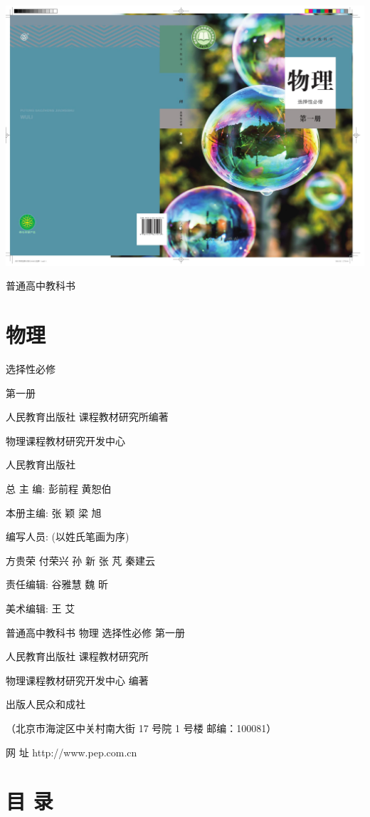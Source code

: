 \documentclass[10pt]{article}
\begin{document}
\begin{center}
\includegraphics[max width=1.0\textwidth]{images/01910e4c-ebb8-7d2c-8f2f-2375bc1d2d12_1_258799.jpg}
\end{center}

普通高中教科书

\section*{物理}

选择性必修

第一册

人民教育出版社 课程教材研究所编著

物理课程教材研究开发中心

人民教育出版社

总 主 编: 彭前程 黄恕伯

本册主编: 张 颖 梁 旭

编写人员: (以姓氏笔画为序)

方贵荣 付荣兴 孙 新 张 芃 秦建云

责任编辑: 谷雅慧 魏 昕

美术编辑: 王 艾

普通高中教科书 物理 选择性必修 第一册

人民教育出版社 课程教材研究所

物理课程教材研究开发中心 编著

出版人民众和成社

（北京市海淀区中关村南大街 17 号院 1 号楼 邮编：100081）

网 址 http://www.pep.com.cn

\section*{目 录}
\end{document}

